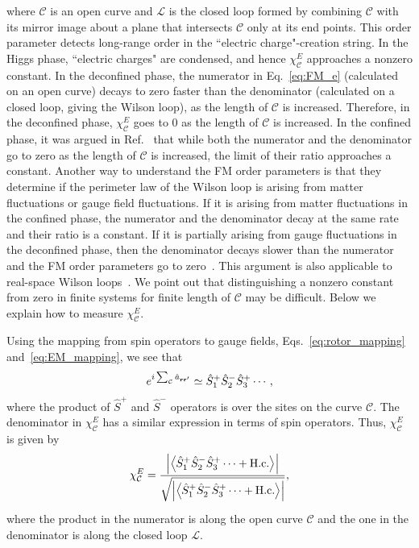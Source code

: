 \documentclass[twocolumn,superscriptaddress,amsmath,amssymb,aps,prx,nofootinbib]{revtex4-2}
\begin{document}
where $\mathcal{C}$ is an open curve and $\mathcal{L}$ is the closed loop formed by combining $\mathcal{C}$ with its mirror image about a plane that intersects $\mathcal{C}$ only at its end points. This order parameter detects long-range order in the ``electric charge"-creation string. In the Higgs phase, ``electric charges" are condensed, and hence $\chi_{\mathcal{C}}^E$ approaches a nonzero constant. In the deconfined phase, the numerator in Eq.~\eqref{eq:FM_e} (calculated on an open curve) decays to zero faster than the denominator (calculated on a closed loop, giving the Wilson loop), as the length of $\mathcal{C}$ is increased. Therefore, in the deconfined phase, $\chi_{\mathcal{C}}^E$ goes to 0 as the length of $\mathcal{C}$ is increased. In the confined phase, it was argued in Ref.~\cite{fredenhagen1986} that while both the numerator and the denominator go to zero as the length of $\mathcal{C}$ is increased, the limit of their ratio approaches a constant.
Another way to understand the FM order parameters is that they determine if the perimeter law of the Wilson loop is arising from matter fluctuations or gauge  field fluctuations. If it is arising from matter fluctuations in the confined phase, the numerator and the denominator decay at the same rate and their ratio is a constant. If it is partially arising  from gauge fluctuations in the deconfined phase, then the denominator decays slower than the numerator and the FM order parameters go to zero~\cite{fredenhagen1983charged}. This argument is also applicable to real-space Wilson loops~\cite{fredenhagen1988dual,gregor2011diagnosing,xu2024critical,verresen2021}.
We point out that distinguishing a nonzero constant from zero in finite systems for finite length of $\mathcal{C}$ may be difficult.
Below we explain how to measure $\chi_{\mathcal{C}}^E$. 

Using the mapping from spin operators to gauge fields, Eqs.~\eqref{eq:rotor_mapping} and~\eqref{eq:EM_mapping}, we see that
\begin{equation} 
   e^{i\sum_\mathcal{C} \hat{a}_{\vb{r} \vb{r}'}} \simeq \hat{S}_1^+\hat{S}_2^-\hat{S}_3^+\cdots,
\end{equation}
where the product of $\hat{S}^+$ and $ \hat{S}^-$ operators is over the sites on the curve $\mathcal{C}$.
The denominator in $\chi_{\mathcal{C}}^E$ has a similar expression in terms of spin operators. Thus, $\chi_{\mathcal{C}}^{E}$ is given by
\begin{equation}\label{eq:FM_e_plus_minus}
      \chi_{\mathcal{C}}^E = \frac{\abs{ \expval{ \hat{S}_1^+\hat{S}_2^-\hat{S}_3^+\cdots +\text{H.c.} } } }{\sqrt{ \abs{ \expval{ \hat{S}_1^+\hat{S}_2^-\hat{S}_3^+\cdots + \text{H.c.} }  }}},
\end{equation}
where the product in the numerator is along the open curve $\mathcal{C}$ and the one in the denominator is along the closed loop $\mathcal{L}$.
\end{document}

